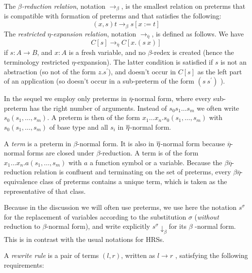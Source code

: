 \documentclass{article}
\begin{document}
The $\beta $\emph{-reduction relation}, notation $\rightarrow _{\beta }$, is
the smallest relation on preterms that is compatible with formation of
preterms and that satisfies the following:%
\begin{equation*}
(x,s)t\rightarrow _{\beta }s[x:=t]
\end{equation*}%
The \emph{restricted }$\eta $\emph{-expansion relation}, notation $%
\rightarrow _{\overline{\eta }}$, is defined as follows. We have%
\begin{equation*}
C[s]\rightarrow _{\overline{\eta }}C[x.(s\ x)]
\end{equation*}%
if $s:A\rightarrow B$, and $x:A$ is a fresh variable, and no $\beta $-redex
is created (hence the terminology restricted $\eta $-expansion). The latter
condition is satisfied if $s$ is not an abstraction (so not of the form $%
z.s^{\prime }$), and doesn't occur in $C[s]$ as the left part of an
application (so doesn't occur in a sub-preterm of the form $(s\ s^{\prime })$%
).

In the sequel we employ only preterms in $\overline{\eta }$-normal form,
where every sub-preterm has the right number of arguments. Instead of $%
s_{0}s_{1}\ldots s_{m}$ we often write $s_{0}(s_{1},\ldots ,s_{m})$. A
preterm is then of the form $x_{1}\ldots x_{n}.s_{0}(s_{1},\ldots ,s_{m})$
with $s_{0}(s_{1},\ldots ,s_{m})$ of base type and all $s_{i}$ in $\overline{%
\eta }$-normal form.

A \emph{term} is a preterm in $\beta $-normal form. It is also in $\overline{%
\eta }$-normal form because $\overline{\eta }$-normal forms are closed under 
$\beta $-reduction. A term is of the form $x_{1}\ldots x_{n}.a(s_{1},\ldots
,s_{m})$ with $a$ a function symbol or a variable. Because the $\beta 
\overline{\eta }$-reduction relation is confluent and terminating on the set
of preterms, every $\beta \overline{\eta }$-equivalence class of preterms
contains a unique term, which is taken as the representative of that class.

Because in the discussion we will often use preterms, we use here the
notation $s^{\sigma }$ for the replacement of variables according to the
substitution $\sigma $ (\emph{without} reduction to $\beta $-normal form),
and write explicitly $s^{\sigma }\downarrow _{\beta }$for its $\beta $%
-normal form. This is in contrast with the usual notations for HRSs.

A \emph{rewrite rule} is a pair of terms $(l,r)$, written as $l\rightarrow r$%
, satisfying the following requirements:
\end{document}
